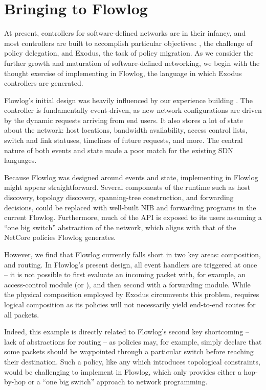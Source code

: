 \section{Bringing \sys to Flowlog}
\label{sec:pane-in-flowlog}

At present, controllers for software-defined networks are in their infancy, and
most controllers are built to accomplish particular objectives: \sys, the challenge of policy
delegation, and Exodus, the task of policy migration. As we consider the further
growth and maturation of software-defined networking, we begin with the thought exercise
of implementing \sys in Flowlog, the language in which Exodus controllers are generated.

Flowlog's initial design was heavily influenced by our experience building \sys.
The \sys controller is fundamentally event-driven, as new network configurations
are driven by the dynamic requests arriving from end users. It also stores a lot of state
about the network: host locations, bandwidth availability, access control lists, switch
and link statuses, timelines of future requests, and more. The central nature of both events
and state made \sys a poor match for the existing SDN languages.

Because Flowlog was designed around events and state, implementing \sys in Flowlog
might appear straightforward. Several components of the \sys runtime such as host
discovery, topology discovery, spanning-tree construction, and forwarding decisions,
could be replaced with well-built NIB and forwarding programs in the current Flowlog.
Furthermore, much of the \sys API is exposed to its users assuming a ``one big switch''
abstraction of the network, which aligns with that of the NetCore policies Flowlog generates.

However, we find that Flowlog currently falls short in two key areas: composition, and routing.
In Flowlog's present design, all event handlers are triggered at once -- it is not possible to
first evaluate an incoming packet with, for example, an access-control module (or \sys), and
then second with a forwarding module. While the physical composition employed by Exodus
circumvents this problem, \sys requires logical composition as its policies will not necessarily
yield end-to-end routes for all packets.

Indeed, this example is directly related to Flowlog's second key shortcoming -- lack of abstractions for routing -- as \sys policies may, for example,
simply declare that some packets should be waypointed through a particular switch before
reaching their destination. Such a policy, like any which introduces topological constraints,
would be challenging to implement in Flowlog, which only provides either a hop-by-hop or
a ``one big switch'' approach to network programming.

